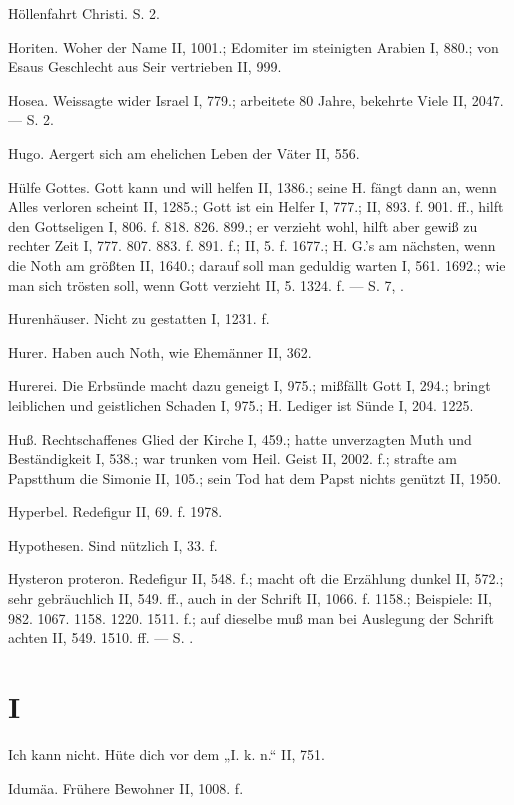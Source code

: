 Höllenfahrt Christi. S.  2.

Horiten. Woher der Name II, 1001.; Edomiter im steinigten Arabien I, 880.; von Esaus Geschlecht aus Seir vertrieben II, 999.

Hosea. Weissagte wider Israel I, 779.; arbeitete 80 Jahre, bekehrte Viele II, 2047. — S.  2.

Hugo. Aergert sich am ehelichen Leben der Väter II, 556.

Hülfe Gottes. Gott kann und will helfen II, 1386.; seine H. fängt dann an, wenn Alles verloren scheint II, 1285.; Gott ist ein Helfer I, 777.; II, 893. f. 901. ff., hilft den Gottseligen I, 806. f. 818. 826. 899.; er verzieht wohl, hilft aber gewiß zu rechter Zeit I, 777. 807. 883. f. 891. f.; II, 5. f. 1677.; H. G.’s am nächsten, wenn die Noth am größten II, 1640.; darauf soll man geduldig warten I, 561. 1692.; wie man sich trösten soll, wenn Gott verzieht II, 5. 1324. f. — S.  7, .

Hurenhäuser. Nicht zu gestatten I, 1231. f.

Hurer. Haben auch Noth, wie Ehemänner II, 362.

Hurerei. Die Erbsünde macht dazu geneigt I, 975.; mißfällt Gott I, 294.; bringt leiblichen und geistlichen Schaden I, 975.; H. Lediger ist Sünde I, 204. 1225.

Huß. Rechtschaffenes Glied der Kirche I, 459.; hatte unverzagten Muth und Beständigkeit I, 538.; war trunken vom Heil. Geist II, 2002. f.; strafte am Papstthum die Simonie II, 105.; sein Tod hat dem Papst nichts genützt II, 1950.

Hyperbel. Redefigur II, 69. f. 1978.

Hypothesen. Sind nützlich I, 33. f.

Hysteron proteron. Redefigur II, 548. f.; macht oft die Erzählung dunkel II, 572.; sehr gebräuchlich II, 549. ff., auch in der Schrift II, 1066. f. 1158.; Beispiele: II, 982. 1067. 1158. 1220. 1511. f.; auf dieselbe muß man bei Auslegung der Schrift achten II, 549. 1510. ff. — S. .

\section{I}

Ich kann nicht. Hüte dich vor dem „I. k. n.“ II, 751.

Idumäa. Frühere Bewohner II, 1008. f.

